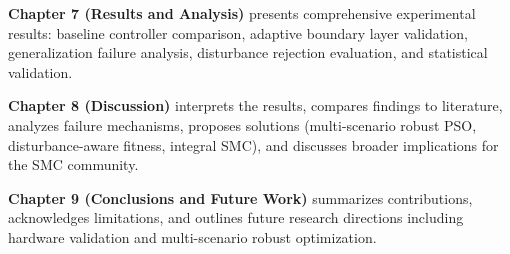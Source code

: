 \documentclass[12pt,a4paper,oneside]{report}
\begin{document}
\textbf{Chapter 7 (Results and Analysis)} presents comprehensive experimental results: baseline controller comparison, adaptive boundary layer validation, generalization failure analysis, disturbance rejection evaluation, and statistical validation.

\textbf{Chapter 8 (Discussion)} interprets the results, compares findings to literature, analyzes failure mechanisms, proposes solutions (multi-scenario robust PSO, disturbance-aware fitness, integral SMC), and discusses broader implications for the SMC community.

\textbf{Chapter 9 (Conclusions and Future Work)} summarizes contributions, acknowledges limitations, and outlines future research directions including hardware validation and multi-scenario robust optimization.


% 
% 
% 
% 
% 
% 
% 
% 




\end{document}
